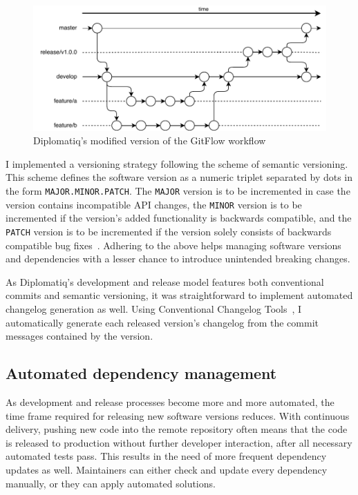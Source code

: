 \begin{figure}[!htb]
    \centering
    \includegraphics[width=\textwidth]{figures/git-workflow.pdf}
    \caption{Diplomatiq's modified version of the GitFlow workflow}
    \label{fig:git-workflow}
\end{figure}

I implemented a versioning strategy following the scheme of semantic versioning. This scheme defines the software version as a numeric triplet separated by dots in the form \lstinline{MAJOR.MINOR.PATCH}. The \lstinline{MAJOR} version is to be incremented in case the version contains incompatible API changes, the \lstinline{MINOR} version is to be incremented if the version's added functionality is backwards compatible, and the \lstinline{PATCH} version is to be incremented if the version solely consists of backwards compatible bug fixes~\cite{semver}. Adhering to the above helps managing software versions and dependencies with a lesser chance to introduce unintended breaking changes.

As Diplomatiq's development and release model features both conventional commits and semantic versioning, it was straightforward to implement automated changelog generation as well. Using Conventional Changelog Tools~\cite{conventional-changelog}, I automatically generate each released version's changelog from the commit messages contained by the version.

\subsection{Automated dependency management}

As development and release processes become more and more automated, the time frame required for releasing new software versions reduces. With continuous delivery, pushing new code into the remote repository often means that the code is released to production without further developer interaction, after all necessary automated tests pass. This results in the need of more frequent dependency updates as well. Maintainers can either check and update every dependency manually, or they can apply automated solutions.

